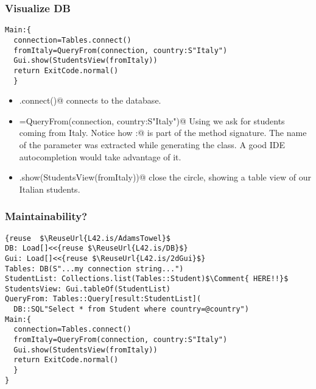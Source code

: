 \begin{frame}[fragile]
\frametitle{Visualize DB}
\begin{NiceCode}{59ex}{1}
\begin{lstlisting}
Main:{
  connection=Tables.connect()
  fromItaly=QueryFrom(connection, country:S"Italy")
  Gui.show(StudentsView(fromItaly))
  return ExitCode.normal()
  }
\end{lstlisting}
\end{NiceCode}
\begin{itemize}
\item \Q@Tables.connect()@ connects to the database.
\item\Q@fromItaly=QueryFrom(connection, country:S"Italy")@
Using \Q@QueryForm@ we ask for students coming from Italy.
Notice how \Q@country:@ is part of the method signature.
The name of the parameter was extracted while generating the class.
A good IDE autocompletion would take advantage of it.
\item\Q@Gui.show(StudentsView(fromItaly))@
close the circle, showing a table view of our Italian students.

\end{itemize}
\end{frame}


\begin{frame}[fragile]
\frametitle{Maintainability?}
\begin{NiceCode}{59ex}{1}
\begin{lstlisting}
{reuse  $\ReuseUrl{L42.is/AdamsTowel}$
DB: Load[]<<{reuse $\ReuseUrl{L42.is/DB}$}
Gui: Load[]<<{reuse $\ReuseUrl{L42.is/2dGui}$}
Tables: DB(S"...my connection string...")
StudentList: Collections.list(Tables::Student)$\Comment{ HERE!!}$
StudentsView: Gui.tableOf(StudentList)
QueryFrom: Tables::Query[result:StudentList](
  DB::SQL"Select * from Student where country=@country")
Main:{
  connection=Tables.connect()
  fromItaly=QueryFrom(connection, country:S"Italy")
  Gui.show(StudentsView(fromItaly))
  return ExitCode.normal()
  }
}
\end{lstlisting}
\end{NiceCode}
\end{frame}

